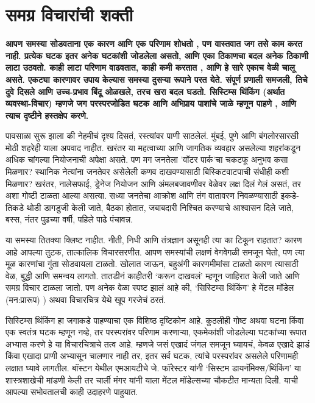 \chapter{समग्र विचारांची शक्ती }

\textcolor{blue!60!black}{\textbf{आपण समस्या सोडवताना एक कारण आणि एक परिणाम शोधतो , पण वास्तवात जग तसे काम करत नाही. प्रत्येक घटक इतर अनेक घटकांशी जोडलेला असतो, आणि एका ठिकाणचा बदल अनेक ठिकाणी लाटा उठवतो. काही लाटा परिणाम वाढवतात, काही कमी करतात , आणि हे सारे एकाच वेळी चालू असते. एकट्या कारणावर उपाय केल्यास समस्या दुसऱ्या रूपाने परत येते. संपूर्ण प्रणाली समजली, तिचे दुवे दिसले आणि उच्च-प्रभाव बिंदू ओळखले, तरच खरा बदल घडतो. सिस्टिम्स थिंकिंग (अर्थात व्यवस्था-विचार) म्हणजे जग परस्परजोडित घटक आणि अभिप्राय पाशांचे जाळे म्हणून पाहणे , आणि त्याच दृष्टीने हस्तक्षेप करणे.}}

पावसाळा सुरू झाला की नेहमीचं दृश्य दिसतं, रस्त्यांवर पाणी साठलेलं. मुंबई, पुणे आणि बंगलोरसारखी मोठी शहरेही याला अपवाद नाहीत. खरंतर या महत्वाच्या आणि जागतिक व्यवहार असलेल्या शहरांकडून अधिक चांगल्या नियोजनाची अपेक्षा असते. पण मग जनतेला 'वॉटर पार्क'चा चकटफू अनुभव कसा मिळणार? स्थानिक नेत्यांना जनतेवर असेलेली कणव दाखवण्यासाठी बिस्किटवाटपाची संधीही कशी मिळणार? खरंतर, नालेसफाई, ड्रेनेज नियोजन आणि अंमलबजावणीवर वेळेवर लक्ष दिलं गेलं असतं, तर अशा गोष्टी टाळता आल्या असत्या. सध्या जनतेचा आक्रोश आणि तंग वातावरण निवळण्यासाठी इकडे-तिकडे थोडी डागडुजी केली जाते, बैठका होतात, जबाबदारी निश्चित करण्याचे आश्वासन दिले जाते, बस्स, नंतर पुढच्या वर्षी, पहिले पाढे पंचावन्न.

या समस्या तितक्या क्लिष्ट नाहीत. नीती, निधी आणि तंत्रज्ञान असूनही त्या का टिकून राहतात? कारण आहे आपल्या तुटक, तात्कालिक विचारसरणीत. आपण समस्यांची लक्षणं वेगवेगळी समजून घेतो, पण त्या मूळ कारणांचा गुंता सोडवायला टाळतो. खोलात जाऊन, बहुअंगी कारणमीमांसा टाळतो कारण त्यासाठी वेळ, बुद्धी आणि समन्वय लागतो. तातडीनं काहीतरी ‘करून दाखवलं’ म्हणून जाहिरात केली जाते आणि समग्र विचार टाळला जातो. पण अनेक वेळा स्पष्ट झालं आहे की, ‘सिस्टिम्स थिंकिंग’ हे मेंटल मॉडेल (मन:प्रारूप) ) अथवा विचारचित्र येथे खूप गरजेचं ठरतं.

सिस्टिम्स थिंकिंग हा जगाकडे पाहण्याचा एक विशिष्ठ दृष्टिकोन आहे. कुठलीही गोष्ट अथवा घटना किंवा एक स्वतंत्र घटक म्हणून नव्हे, तर परस्परांवर परिणाम करणाऱ्या, एकमेकांशी जोडलेल्या घटकांच्या रूपात अभ्यास करणे हे या विचारचित्राचे तत्व आहे. म्हणजे जसं एखादं जंगल समजून घ्यायचं, केवळ एखादे झाडं किंवा एखादा प्राणी अभ्यासून चालणार नाही तर, इतर सर्व घटक, त्यांचे परस्परांवर असलेले परिणामही लक्षात घ्यावे लागतील. बॉस्टन येथील एमआयटीचे जे. फॉरेस्टर यांनी ‘सिस्टम डायनॅमिक्स/थिंकिंग’ या शास्त्रशाखेची मांडणी केली तर चार्ली मंगर यांनी याला मेंटल मॉडेल्सच्या चौकटीत मान्यता दिली. याची आपल्या सभोवतालची काही उदाहरणे पाहुयात. 

